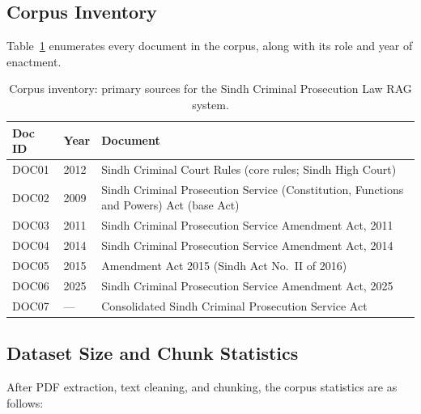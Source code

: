 \documentclass[11pt,a4paper]{article}
\begin{document}
\subsection{Corpus Inventory}

Table~\ref{tab:corpus} enumerates every document in the corpus, along with its role and year of enactment.

\begin{table}[H]
\centering
\footnotesize
\caption{Corpus inventory: primary sources for the Sindh Criminal Prosecution Law RAG system.}
\label{tab:corpus}
\renewcommand{\arraystretch}{1.25}
\begin{tabularx}{\textwidth}{@{}l l >{\RaggedRight\arraybackslash}X@{}}
\toprule
\textbf{Doc ID} & \textbf{Year} & \textbf{Document} \\
\midrule
DOC01 & 2012 & Sindh Criminal Court Rules (core rules; Sindh High Court) \\
DOC02 & 2009 & Sindh Criminal Prosecution Service (Constitution, Functions and Powers) Act (base Act) \\
DOC03 & 2011 & Sindh Criminal Prosecution Service Amendment Act, 2011 \\
DOC04 & 2014 & Sindh Criminal Prosecution Service Amendment Act, 2014 \\
DOC05 & 2015 & Amendment Act 2015 (Sindh Act No.\ II of 2016) \\
DOC06 & 2025 & Sindh Criminal Prosecution Service Amendment Act, 2025 \\
DOC07 & ---  & Consolidated Sindh Criminal Prosecution Service Act \\
\bottomrule
\end{tabularx}
\end{table}

\subsection{Dataset Size and Chunk Statistics}

After PDF extraction, text cleaning, and chunking, the corpus statistics are as follows:
\end{document}

